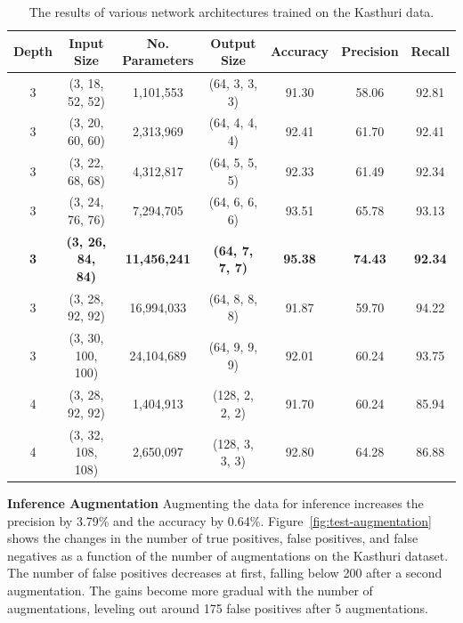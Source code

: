 \begin{table}
	\scriptsize
	\centering
	\begin{tabular}{c c c c c c c}
		\hline
		\textbf{Depth} & \textbf{Input Size} & \textbf{No. Parameters} & \textbf{Output Size} & \textbf{Accuracy} & \textbf{Precision} & \textbf{Recall} \\ \hline
		      3        & (3, 18, 52, 52)     & 1,101,553               & (64, 3, 3, 3)        & 91.30             & 58.06              & 92.81 \\
		      3        & (3, 20, 60, 60)     & 2,313,969               & (64, 4, 4, 4)        & 92.41             & 61.70              & 92.41 \\
		      3        & (3, 22, 68, 68)     & 4,312,817               & (64, 5, 5, 5)        & 92.33             & 61.49              & 92.34 \\
		      3        & (3, 24, 76, 76)     & 7,294,705               & (64, 6, 6, 6)        & 93.51             & 65.78              & 93.13 \\
		      \textbf{3}        & \textbf{(3, 26, 84, 84)}     & \textbf{11,456,241}              & \textbf{(64, 7, 7, 7)}        & \textbf{95.38}             & \textbf{74.43}              & \textbf{92.34} \\
		      3        & (3, 28, 92, 92)     & 16,994,033              & (64, 8, 8, 8)        & 91.87             & 59.70              & 94.22 \\
		      3        & (3, 30, 100, 100)   & 24,104,689              & (64, 9, 9, 9)        & 92.01             & 60.24              & 93.75 \\
		      4        & (3, 28, 92, 92)     & 1,404,913               & (128, 2, 2, 2)       & 91.70             & 60.24             & 85.94 \\
		      4        & (3, 32, 108, 108)   & 2,650,097               & (128, 3, 3, 3)       & 92.80             & 64.28              & 86.88 \\\hline
	\end{tabular}
	\caption{The results of various network architectures trained on the Kasthuri data.}
	\label{table:input-size}
\end{table}

\noindent
\textbf{Inference Augmentation}
Augmenting the data for inference increases the precision by 3.79\% and the accuracy by 0.64\%. 
Figure~\ref{fig:test-augmentation} shows the changes in the number of true positives, false positives, and false negatives as a function of the number of augmentations on the Kasthuri dataset.
The number of false positives decreases at first, falling below 200 after a second augmentation.
The gains become more gradual with the number of augmentations, leveling out around 175 false positives after 5 augmentations.

